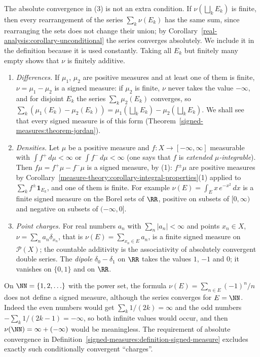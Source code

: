 The absolute convergence in (3) is not an extra condition. If $\nu(\bigsqcup_kE_k)$ is finite, then every rearrangement of the series $\sum_k\nu(E_k)$ has the same sum, since rearranging the
sets does not change their union; by Corollary~\ref{real-analysis:corollary-unconditional} the series converges absolutely. We include it in the definition because it is used constantly.
Taking all $E_k$ but finitely many empty shows that $\nu$ is finitely additive.

\begin{example}\label{signed-measures:example-signed-measures}
\begin{enumerate}
\item \emph{Differences.} If $\mu_1$, $\mu_2$ are positive measures and at least one of them is finite, $\nu = \mu_1 - \mu_2$ is a signed measure: if $\mu_2$ is finite, $\nu$ never takes the value
$-\infty$, and for disjoint $E_k$ the series $\sum_k\mu_2(E_k)$ converges, so $\sum_k(\mu_1(E_k) - \mu_2(E_k)) = \mu_1(\bigsqcup_kE_k) - \mu_2(\bigsqcup_kE_k)$. We shall see that every signed
measure is of this form (Theorem~\ref{signed-measures:theorem-jordan}).
\item \emph{Densities.} Let $\mu$ be a positive measure and $f \colon X \to [-\infty, \infty]$ measurable with $\int f^+\,d\mu < \infty$ or $\int f^-\,d\mu < \infty$ (one says that $f$ is
\emph{extended $\mu$-integrable}). Then $f\mu = f^+\mu - f^-\mu$ is a signed measure, by (1): $f^\pm\mu$ are positive measures by Corollary~\ref{measure-theory:corollary-integral-properties}(1)
applied to $\sum_kf^\pm\mathbf{1}_{E_k}$, and one of them is finite. For example $\nu(E) = \int_Ex\,e^{-x^2}\,dx$ is a finite signed measure on the Borel sets of $\RR$, positive on subsets of
$[0, \infty)$ and negative on subsets of $(-\infty, 0]$.
\item \emph{Point charges.} For real numbers $a_n$ with $\sum_n|a_n| < \infty$ and points $x_n \in X$, $\nu = \sum_na_n\delta_{x_n}$, that is $\nu(E) = \sum_{x_n \in E}a_n$, is a finite signed measure on
$\mathcal{P}(X)$; the countable additivity is the associativity of absolutely convergent double series. The \emph{dipole} $\delta_0 - \delta_1$ on $\RR$ takes the values $1$, $-1$ and $0$; it vanishes on
$\{0, 1\}$ and on $\RR$.
\end{enumerate}
\end{example}

\begin{counterexample}\label{signed-measures:counterexample-alternating}
On $\NN = \{1, 2, \ldots\}$ with the power set, the formula $\nu(E) = \sum_{n \in E}(-1)^n/n$ does not define a signed measure, although the series converges for $E = \NN$. Indeed the even
numbers would get $\sum_k1/(2k) = \infty$ and the odd numbers $-\sum_k1/(2k - 1) = -\infty$, so both infinite values would occur, and then $\nu(\NN) = \infty + (-\infty)$ would be meaningless. The
requirement of absolute convergence in Definition~\ref{signed-measures:definition-signed-measure} excludes exactly such conditionally convergent ``charges''.
\end{counterexample}

